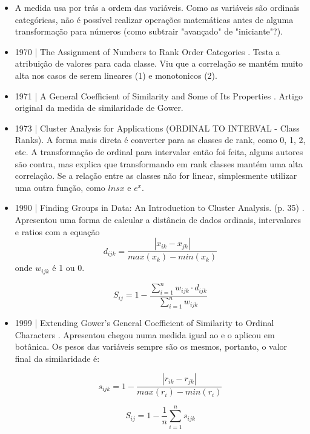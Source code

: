 \documentclass[preprint,12pt]{elsarticle}
\begin{document}
\begin{itemize}
\item A medida usa por trás a ordem das variáveis. Como as variáveis são ordinais categóricas, não é possível realizar operações matemáticas antes de alguma transformação para números (como subtrair "avançado" de "iniciante"?).

\item 1970 | The Assignment of Numbers to Rank Order Categories \cite{assignment-rank-order-1970}. Testa a atribuição de valores para cada classe. Viu que a correlação se mantém muito alta nos casos de serem lineares (1) e monotonicos (2).

\item 1971 | A General Coefficient of Similarity and Some of Its Properties \cite{gower-original-similarity}. Artigo original da medida de similaridade de Gower.

\item 1973 | Cluster Analysis for Applications \cite{ANDERBERG197325} (ORDINAL TO INTERVAL - Class Ranks). A forma mais direta é converter para as classes de rank, como 0, 1, 2, etc.  A transformação de ordinal para intervalar então foi feita, alguns autores são contra, mas \cite{ANDERBERG197325} explica que transformando em rank classes mantém uma alta correlação. Se a relação entre as classes não for linear, simplesmente utilizar uma outra função, como $ln sx$ e $e^x$. 

\item 1990 | Finding Groups in Data: An Introduction to Cluster Analysis. (p. 35) \cite{analysis-cluster}. Apresentou uma forma de calcular a distância de dados ordinais, intervalares e ratios com a equação
    \begin{equation}
        d_{ijk} =  \frac{|x_{ik} - x_{jk}|}{max(x_k) - min(x_k)}
    \end{equation}
    onde $w_{ijk}$ é 1 ou 0.

    \begin{equation}
        S_{ij} = 1 - \frac{\sum^n_{i=1} w_{ijk} \cdot d_{ijk}}{\sum^n_{i=1} w_{ijk}}
    \end{equation}

\item 1999 | Extending Gower's General Coefficient of Similarity to Ordinal Characters  \cite{extending-gower-ordinal}. Apresentou chegou numa medida igual ao \cite{analysis-cluster} e o aplicou em botânica. Os pesos das variáveis sempre são os mesmos, portanto, o valor final da similaridade é:

    \begin{equation}
        s_{ijk} =  1 - \frac{|r_{ik} - r_{jk}|}{max(r_i) - min(r_i)}
    \end{equation}
    
    \begin{equation}
        S_{ij} =  1 - \frac{1}{n}\sum^n_{i=1}s_{ijk}
    \end{equation}
\end{itemize}
\end{document}
